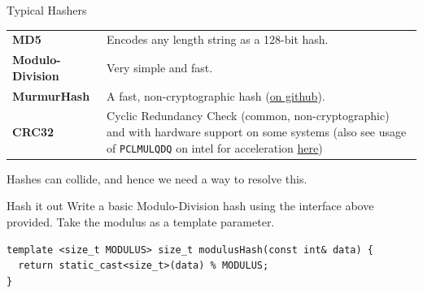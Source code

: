 \begin{sidenotebox}{Typical Hashers}
    \begin{center}
        \begin{tabular}{l p{}}
            \textbf{MD5}             & Encodes any length string as a 128-bit hash.                                                                                                                                                                                                                                                                                \\
            \textbf{Modulo-Division} & Very simple and fast.                                                                                                                                                                                                                                                                                                       \\
            \textbf{MurmurHash}      & A fast, non-cryptographic hash (\href{https://github.com/aappleby/smhasher}{on github}).                                                                                                                                                                                                                                    \\
            \textbf{CRC32}           & Cyclic Redundancy Check (common, non-cryptographic) and with hardware support on some systems (also see usage of \texttt{PCLMULQDQ} on intel for acceleration \href{https://www.intel.com/content/dam/www/public/us/en/documents/white-papers/fast-crc-computation-generic-polynomials-pclmulqdq-paper.pdf}{here})
        \end{tabular}
    \end{center}
\end{sidenotebox}
Hashes can collide, and hence we need a way to resolve this.

\begin{examplebox}{Hash it out}
    Write a basic Modulo-Division hash using the interface above provided. Take the modulus as a template parameter.
    \tcblower
    \begin{verbatim}
template <size_t MODULUS> size_t modulusHash(const int& data) {
  return static_cast<size_t>(data) % MODULUS;
}
    \end{verbatim}
\end{examplebox}

